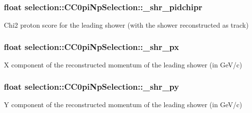 \subsubsection[{\texorpdfstring{\+\_\+shr\+\_\+pidchipr}{_shr_pidchipr}}]{\setlength{\rightskip}{0pt plus 5cm}float selection\+::\+C\+C0pi\+Np\+Selection\+::\+\_\+shr\+\_\+pidchipr\hspace{0.3cm}{\ttfamily [private]}}\hypertarget{classselection_1_1CC0piNpSelection_aae9294d7e4803ff991e611ea124769bc}{}\label{classselection_1_1CC0piNpSelection_aae9294d7e4803ff991e611ea124769bc}
Chi2 proton score for the leading shower (with the shower reconstructed as track) 
\subsubsection[{\texorpdfstring{\+\_\+shr\+\_\+px}{_shr_px}}]{\setlength{\rightskip}{0pt plus 5cm}float selection\+::\+C\+C0pi\+Np\+Selection\+::\+\_\+shr\+\_\+px\hspace{0.3cm}{\ttfamily [private]}}\hypertarget{classselection_1_1CC0piNpSelection_a52e2043c82f5de7f93ac9bad63563f18}{}\label{classselection_1_1CC0piNpSelection_a52e2043c82f5de7f93ac9bad63563f18}
X component of the reconstructed momentum of the leading shower (in Ge\+V/c) 
\subsubsection[{\texorpdfstring{\+\_\+shr\+\_\+py}{_shr_py}}]{\setlength{\rightskip}{0pt plus 5cm}float selection\+::\+C\+C0pi\+Np\+Selection\+::\+\_\+shr\+\_\+py\hspace{0.3cm}{\ttfamily [private]}}\hypertarget{classselection_1_1CC0piNpSelection_a436dd7081c84003dabb595289d745111}{}\label{classselection_1_1CC0piNpSelection_a436dd7081c84003dabb595289d745111}
Y component of the reconstructed momentum of the leading shower (in Ge\+V/c) 

